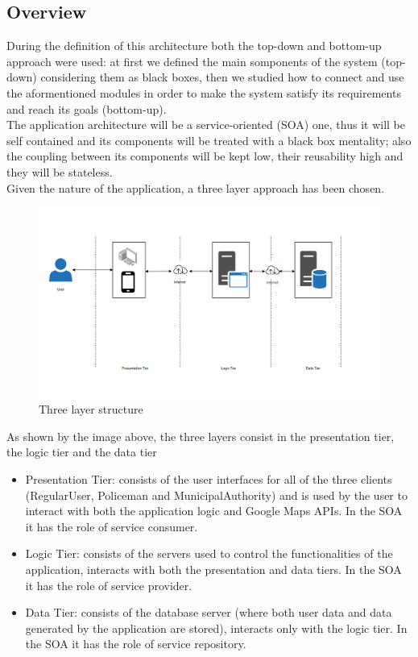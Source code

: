 \subsection{Overview}
During the definition of this architecture both the top-down and bottom-up approach were used: at first we defined the main somponents of the system (top-down) considering them as black boxes, then we studied how to connect and use the aformentioned modules in order to make the system satisfy its requirements and reach its goals (bottom-up).\\
The application architecture will be a service-oriented (SOA) one, thus it will be self contained and its components will be treated with a black box mentality; also the coupling between its components will be kept low, their reusability high and they will be stateless.\\
Given the nature of the application, a three layer approach has been chosen.\newline
\begin{figure}[h!]
	\centering
	\includegraphics[width=\textwidth]{Images/three_layer}
	\caption{Three layer structure}
\end{figure}
\newline
As shown by the image above, the three layers consist in the presentation tier, the logic tier and the data tier
\begin{itemize}
\item Presentation Tier: consists of the user interfaces for all of the three clients (RegularUser, Policeman and MunicipalAuthority) and is used by the user to interact with both the application logic and Google Maps APIs. In the SOA it has the role of service consumer. \newline
\item Logic Tier: consists of the servers used to control the functionalities of the application, interacts with both the presentation and data tiers. In the SOA it has the role of service provider. \newline
\item Data Tier: consists of the database server (where both user data and data generated by the application are stored), interacts only with the logic tier. In the SOA it has the role of service repository. \newline
\end{itemize}
\newpage
